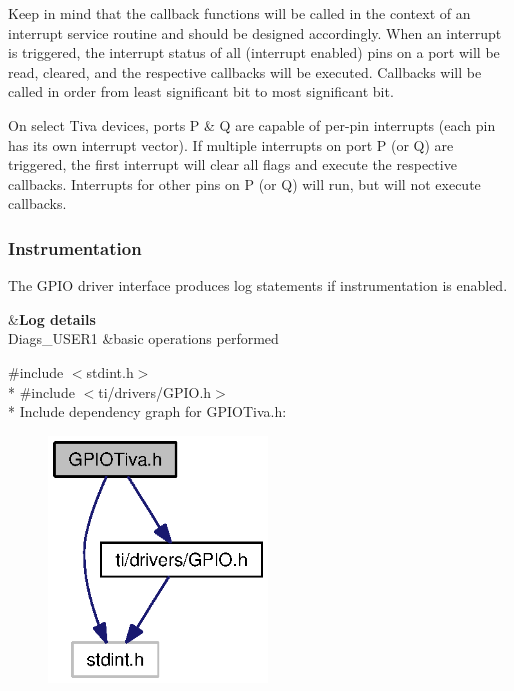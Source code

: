 Keep in mind that the callback functions will be called in the context of an interrupt service routine and should be designed accordingly. When an interrupt is triggered, the interrupt status of all (interrupt enabled) pins on a port will be read, cleared, and the respective callbacks will be executed. Callbacks will be called in order from least significant bit to most significant bit.

On select Tiva devices, ports P \& Q are capable of per-\/pin interrupts (each pin has its own interrupt vector). If multiple interrupts on port P (or Q) are triggered, the first interrupt will clear all flags and execute the respective callbacks. Interrupts for other pins on P (or Q) will run, but will not execute callbacks.

\subsubsection*{Instrumentation}

The G\+P\+I\+O driver interface produces log statements if instrumentation is enabled.

\begin{TabularC}{2}
\hline
{}&{\bf Log details  }\\
Diags\+\_\+\+U\+S\+E\+R1 &basic operations performed \\
\end{TabularC}


{\ttfamily \#include $<$stdint.\+h$>$}\\*
{\ttfamily \#include $<$ti/drivers/\+G\+P\+I\+O.\+h$>$}\\*
Include dependency graph for G\+P\+I\+O\+Tiva.\+h\+:
\nopagebreak
\begin{figure}[H]
\begin{center}
\leavevmode
\includegraphics[width=165pt]{_g_p_i_o_tiva_8h__incl}
\end{center}
\end{figure}
